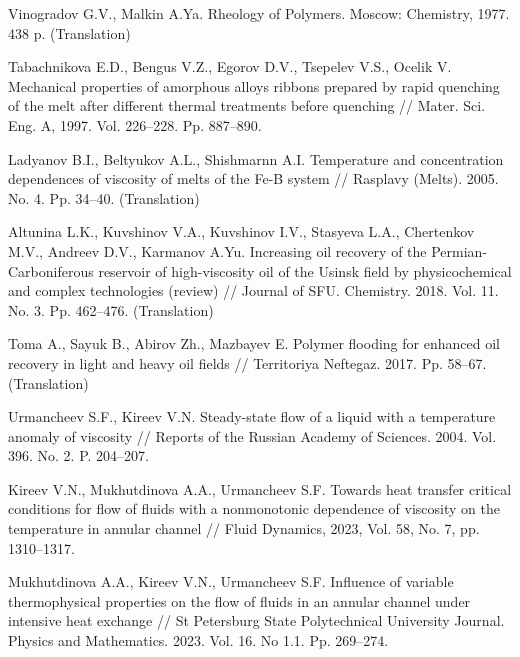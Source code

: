 \documentclass[12pt]{llncs}
\begin{document}
\begin{thebibliography}{99} %

 Vinogradov G.V., Malkin A.Ya. Rheology of Polymers. Moscow: Chemistry, 1977. 438 p. (Translation)

 Tabachnikova E.D., Bengus V.Z., Egorov D.V., Tsepelev V.S., Ocelik V. Mechanical properties of amorphous alloys ribbons prepared by rapid quenching of the melt after different thermal treatments before quenching // Mater. Sci. Eng. A, 1997. Vol. 226--228. Pp. 887--890.

 Ladyanov B.I., Beltyukov A.L., Shishmarnn A.I. Temperature and concentration dependences of viscosity of melts of the Fe-B system // Rasplavy (Melts). 2005. No. 4. Pp. 34--40. (Translation)

 Altunina L.K., Kuvshinov V.A., Kuvshinov I.V., Stasyeva L.A., Chertenkov M.V., Andreev D.V., Karmanov A.Yu. Increasing oil recovery of the Permian-Carboniferous reservoir of high-viscosity oil of the Usinsk field by physicochemical and complex technologies (review) // Journal of SFU. Chemistry. 2018. Vol. 11. No. 3. Pp. 462--476. (Translation)

 Toma A., Sayuk B., Abirov Zh., Mazbayev E. Polymer flooding for enhanced oil recovery in light and heavy oil fields // Territoriya Neftegaz. 2017. Pp. 58--67. (Translation)

 Urmancheev S.F., Kireev V.N. Steady-state flow of a liquid with a temperature anomaly of viscosity // Reports of the Russian Academy of Sciences. 2004. Vol. 396. No. 2. P. 204--207. 

 Kireev V.N., Mukhutdinova A.A., Urmancheev S.F. Towards heat transfer critical conditions for flow of fluids with a nonmonotonic dependence of viscosity on the temperature in annular channel // Fluid Dynamics, 2023, Vol. 58, No. 7, pp. 1310--1317.

 Mukhutdinova A.A., Kireev V.N., Urmancheev S.F. Influence of variable thermophysical properties on the flow of fluids in an annular channel under intensive heat exchange // St Petersburg State Polytechnical University Journal. Physics and Mathematics. 2023. Vol. 16. No 1.1. Pp. 269--274.

\end{thebibliography}


\end{document}
